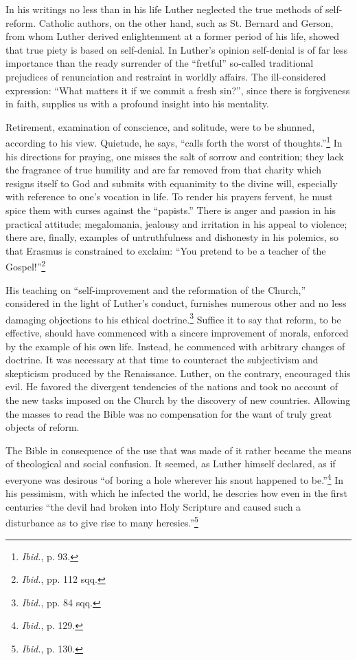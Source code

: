In his writings no less than in his life Luther neglected the true
methods of self-reform. Catholic authors, on the other hand, such
as St. Bernard and Gerson, from whom Luther derived enlightenment at a
former period of his life, showed that true piety is based on
self-denial. In Luther’s opinion self-denial is of far less importance
than the ready surrender of the “fretful” so-called traditional prejudices
of renunciation and restraint in worldly affairs. The ill-considered expression:
“What matters it if we commit a fresh sin?”, since
there is forgiveness in faith, supplies us with a profound insight into
his mentality.

Retirement, examination of conscience, and solitude, were to be
shunned, according to his view. Quietude, he says, “calls forth the
worst of thoughts.”\footnote{\textit{Ibid.}, p. 93.}
In his directions for praying, one misses the salt
of sorrow and contrition; they lack the fragrance of true humility
and are far removed from that charity which resigns itself to God
and submits with equanimity to the divine will, especially with reference
to one’s vocation in life. To render his prayers fervent, he must
spice them with curses against the “papists.” There is anger and passion
in his practical attitude; megalomania, jealousy and irritation in
his appeal to violence; there are, finally, examples of untruthfulness
and dishonesty in his polemics, so that Erasmus is constrained to exclaim:
“You pretend to be a teacher of the Gospel!”\footnote{\textit{Ibid.}, pp. 112 sqq.}

His teaching on “self-improvement and the reformation of the
Church,” considered in the light of Luther’s conduct, furnishes numerous
other and no less damaging objections to his ethical doctrine.\footnote{\textit{Ibid.}, pp. 84 sqq.}
Suffice it to say that reform, to be effective, should have commenced
with a sincere improvement of morals, enforced by the example of
his own life. Instead, he commenced with arbitrary changes of doctrine.
It was necessary at that time to counteract the subjectivism
and skepticism produced by the Renaissance. Luther, on the contrary,
encouraged this evil. He favored the divergent tendencies of the
nations and took no account of the new tasks imposed on the Church
by the discovery of new countries. Allowing the masses to read the
Bible was no compensation for the want of truly great objects of
reform.

The Bible in consequence of the use that was made of it rather became the
means of theological and social confusion. It seemed, as
Luther himself declared, as if everyone was desirous “of boring a hole
wherever his snout happened to be.”\footnote{\textit{Ibid.}, p. 129.}
In his pessimism, with which
he infected the world, he descries how even in the first centuries “the
devil had broken into Holy Scripture and caused such a disturbance
as to give rise to many heresies.”\footnote{\textit{Ibid.}, p. 130.}

